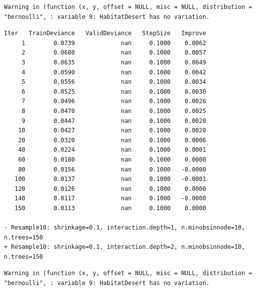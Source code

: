 \documentclass[
  letterpaper,
  DIV=11,
  numbers=noendperiod]{scrartcl}
\begin{document}
\begin{verbatim}
Warning in (function (x, y, offset = NULL, misc = NULL, distribution =
"bernoulli", : variable 9: HabitatDesert has no variation.
\end{verbatim}

\begin{verbatim}
Iter   TrainDeviance   ValidDeviance   StepSize   Improve
     1        0.0739             nan     0.1000    0.0062
     2        0.0680             nan     0.1000    0.0057
     3        0.0635             nan     0.1000    0.0049
     4        0.0590             nan     0.1000    0.0042
     5        0.0556             nan     0.1000    0.0034
     6        0.0525             nan     0.1000    0.0030
     7        0.0496             nan     0.1000    0.0026
     8        0.0470             nan     0.1000    0.0025
     9        0.0447             nan     0.1000    0.0020
    10        0.0427             nan     0.1000    0.0020
    20        0.0320             nan     0.1000    0.0006
    40        0.0224             nan     0.1000    0.0001
    60        0.0180             nan     0.1000    0.0000
    80        0.0156             nan     0.1000   -0.0000
   100        0.0137             nan     0.1000   -0.0001
   120        0.0126             nan     0.1000    0.0000
   140        0.0117             nan     0.1000   -0.0000
   150        0.0113             nan     0.1000    0.0000

- Resample10: shrinkage=0.1, interaction.depth=1, n.minobsinnode=10, n.trees=150 
+ Resample10: shrinkage=0.1, interaction.depth=2, n.minobsinnode=10, n.trees=150 
\end{verbatim}

\begin{verbatim}
Warning in (function (x, y, offset = NULL, misc = NULL, distribution =
"bernoulli", : variable 9: HabitatDesert has no variation.
\end{verbatim}
\end{document}
